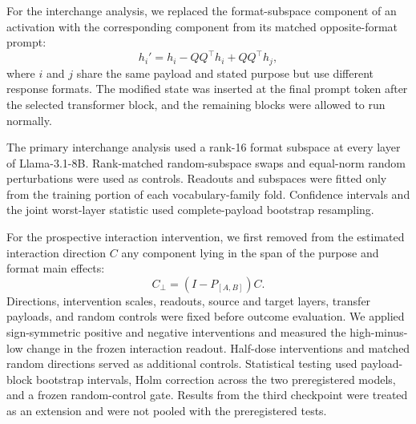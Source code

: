 For the interchange analysis, we replaced the format-subspace component
of an activation with the corresponding component from its matched
opposite-format prompt:
\[
h_i' =
h_i - QQ^\top h_i + QQ^\top h_j,
\]
where $i$ and $j$ share the same payload and stated purpose but use
different response formats. The modified state was inserted at the
final prompt token after the selected transformer block, and the
remaining blocks were allowed to run normally.

The primary interchange analysis used a rank-16 format subspace at
every layer of Llama-3.1-8B. Rank-matched random-subspace swaps and
equal-norm random perturbations were used as controls. Readouts and
subspaces were fitted only from the training portion of each
vocabulary-family fold. Confidence intervals and the joint
worst-layer statistic used complete-payload bootstrap resampling.

For the prospective interaction intervention, we first removed from
the estimated interaction direction $C$ any component lying in the
span of the purpose and format main effects:
\[
C_{\perp} =
\left(I-P_{[A,B]}\right)C.
\]
Directions, intervention scales, readouts, source and target layers,
transfer payloads, and random controls were fixed before outcome
evaluation. We applied sign-symmetric positive and negative
interventions and measured the high-minus-low change in the frozen
interaction readout. Half-dose interventions and matched random
directions served as additional controls. Statistical testing used
payload-block bootstrap intervals, Holm correction across the two
preregistered models, and a frozen random-control gate. Results from
the third checkpoint were treated as an extension and were not pooled
with the preregistered tests.

\endgroup